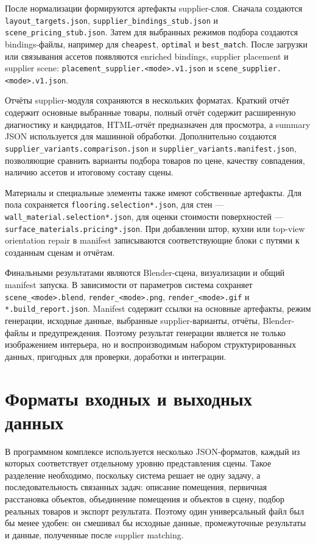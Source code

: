 \documentclass[times]{itmo-student-thesis}
\begin{document}
После нормализации формируются артефакты supplier-слоя. Сначала создаются \texttt{layout\_targets.json}, \texttt{supplier\_bindings\_stub.json} и \texttt{scene\_pricing\_stub.json}. Затем для выбранных режимов подбора создаются bindings-файлы, например для \texttt{cheapest}, \texttt{optimal} и \texttt{best\_match}. После загрузки или связывания ассетов появляются enriched bindings, supplier placement и supplier scene: \texttt{placement\_supplier.<mode>.v1.json} и \texttt{scene\_supplier.<mode>.v1.json}.

Отчёты supplier-модуля сохраняются в нескольких форматах. Краткий отчёт содержит основные выбранные товары, полный отчёт содержит расширенную диагностику и кандидатов, HTML-отчёт предназначен для просмотра, а summary JSON используется для машинной обработки. Дополнительно создаются \texttt{supplier\_variants.comparison.json} и \texttt{supplier\_variants.manifest.json}, позволяющие сравнить варианты подбора товаров по цене, качеству совпадения, наличию ассетов и итоговому составу сцены.

Материалы и специальные элементы также имеют собственные артефакты. Для пола сохраняется \texttt{flooring.selection*.json}, для стен --- \texttt{wall\_material.selection*.json}, для оценки стоимости поверхностей --- \texttt{surface\_materials.pricing*.json}. При добавлении штор, кухни или top-view orientation repair в manifest записываются соответствующие блоки с путями к созданным сценам и отчётам.

Финальными результатами являются Blender-сцена, визуализации и общий manifest запуска. В зависимости от параметров система сохраняет \texttt{scene\_<mode>.blend}, \texttt{render\_<mode>.png}, \texttt{render\_<mode>.gif} и \texttt{*.build\_report.json}. Manifest содержит ссылки на основные артефакты, режим генерации, исходные данные, выбранные supplier-варианты, отчёты, Blender-файлы и предупреждения. Поэтому результат генерации является не только изображением интерьера, но и воспроизводимым набором структурированных данных, пригодных для проверки, доработки и интеграции.
\section{Форматы входных и выходных данных}

В программном комплексе используется несколько JSON-форматов, каждый из которых соответствует отдельному уровню представления сцены. Такое разделение необходимо, поскольку система решает не одну задачу, а последовательность связанных задач: описание помещения, первичная расстановка объектов, объединение помещения и объектов в сцену, подбор реальных товаров и экспорт результата. Поэтому один универсальный файл был бы менее удобен: он смешивал бы исходные данные, промежуточные результаты и данные, полученные после supplier matching.
\end{document}
